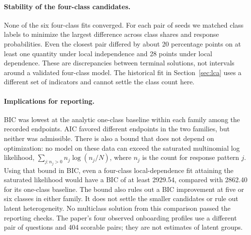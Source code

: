 \paragraph{Stability of the four-class candidates.}
None of the six four-class fits converged. For each pair of seeds we matched
class labels to minimize the largest difference across class shares and
response probabilities. Even the closest pair differed by about
20 percentage points on at least one quantity under local independence
and 28 points under local dependence. These are discrepancies between
terminal solutions, not intervals around a validated four-class model.
The historical fit in Section~\ref{sec:lca} uses a different set of
indicators and cannot settle the class count here.

\paragraph{Implications for reporting.}
BIC was lowest at the analytic one-class baseline within each family among
the recorded endpoints. AIC favored different endpoints in the two
families, but neither was admissible. There is also a bound that does
not depend on optimization: no model on these data can exceed the
saturated multinomial log likelihood, $\sum_{j:n_j>0} n_j\log(n_j/N)$,
where $n_j$ is the count for response pattern $j$. Using that bound in
BIC, even a four-class local-dependence fit attaining the saturated
likelihood would have a BIC of at least 2929.54, compared with 2862.40
for its one-class baseline. The bound also rules out a BIC improvement
at five or six classes in either family. It does not settle the smaller
candidates or rule out latent heterogeneity. No multiclass solution from this
comparison passed the reporting checks. The paper's four observed
onboarding profiles use a different pair of questions and 404 scorable
pairs; they are not estimates of latent groups.


